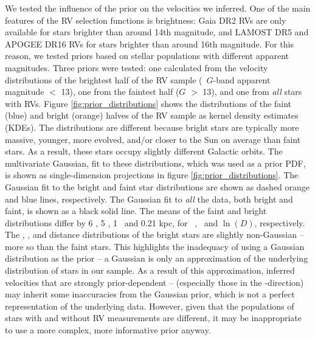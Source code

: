 We tested the influence of the prior on the velocities we inferred.
One of the main features of the RV selection functions is brightness: Gaia DR2
RVs are only available for stars brighter than around 14th magnitude, and
LAMOST DR5 and APOGEE DR16 RVs for stars brighter than around 16th magnitude.
For this reason, we tested priors based on stellar populations with different
apparent magnitudes.
Three priors were tested: one calculated from the velocity distributions of
the brightest half of the RV sample (\gaia\ $G$-band apparent magnitude $<$
13), one from the faintest half ($G$ $>$ 13), and one from {\it all} stars
with RVs.
Figure \ref{fig:prior_distributions} shows the distributions of the faint
(blue) and bright (orange) halves of the RV sample as kernel density estimates
(KDEs).
The distributions are different because bright stars are typically more
massive, younger, more evolved, and/or closer to the Sun on average than faint
stars.
As a result, these stars occupy slightly different Galactic orbits.
The multivariate Gaussian, fit to these distributions, which was used as a
prior PDF, is shown as single-dimension projections in figure
\ref{fig:prior_distributions}.
The Gaussian fit to the bright and faint star distributions are shown as
dashed orange and blue lines, respectively.
The Gaussian fit to {\it all} the data, both bright and faint, is shown as a
black solid line.
The means of the faint and bright distributions differ by 6 \kms, 5 \kms, 1
\kms\ and 0.21 kpc, for \vx\, \vy, \vz\ and $\ln(D)$, respectively.
The \vx, \vy, and distance distributions of the bright stars are slightly
non-Gaussian -- more so than the faint stars.
This highlights the inadequacy of using a Gaussian distribution as the prior
-- a Gaussian is only an approximation of the underlying distribution of stars
in our sample.
As a result of this approximation, inferred velocities that are strongly
prior-dependent -- (\ie especially those in the \y-direction) may inherit some
inaccuracies from the Gaussian prior, which is not a perfect representation of
the underlying data.
However, given that the populations of stars with and without RV measurements
are different, it may be inappropriate to use a more complex, more
informative prior anyway.

